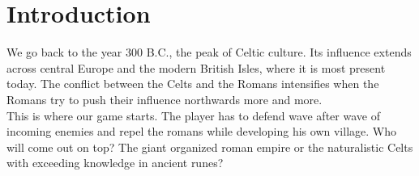 \chapter{Introduction}

We go back to the year 300 B.C., the peak of Celtic culture. Its influence extends across central Europe and the modern British Isles, where it is most present today. The conflict between the Celts and the Romans intensifies when the Romans try to push their influence northwards more and more.\\
This is where our game starts. The player has to defend wave after wave of incoming enemies and repel the romans while developing his own village. Who will come out on top? The giant organized roman empire or the naturalistic Celts with exceeding knowledge in ancient runes?